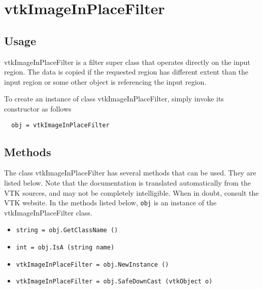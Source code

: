 \section{vtkImageInPlaceFilter}

\subsection{Usage}

 vtkImageInPlaceFilter is a filter super class that 
 operates directly on the input region.  The data is copied
 if the requested region has different extent than the input region
 or some other object is referencing the input region.  

To create an instance of class vtkImageInPlaceFilter, simply
invoke its constructor as follows
\begin{verbatim}
  obj = vtkImageInPlaceFilter
\end{verbatim}
\subsection{Methods}

The class vtkImageInPlaceFilter has several methods that can be used.
  They are listed below.
Note that the documentation is translated automatically from the VTK sources,
and may not be completely intelligible.  When in doubt, consult the VTK website.
In the methods listed below, \verb|obj| is an instance of the vtkImageInPlaceFilter class.
\begin{itemize}
\item  \verb|string = obj.GetClassName ()|

\item  \verb|int = obj.IsA (string name)|

\item  \verb|vtkImageInPlaceFilter = obj.NewInstance ()|

\item  \verb|vtkImageInPlaceFilter = obj.SafeDownCast (vtkObject o)|

\end{itemize}
